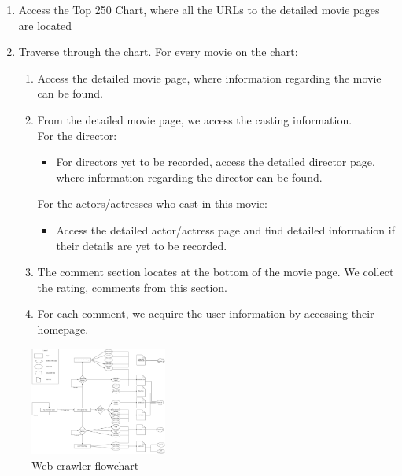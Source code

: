 \begin{CJK*}{UTF8}{gbsn}
\begin{enumerate}
    \item Access the Top 250 Chart, where all the URLs to the detailed movie pages are located
    \item Traverse through the chart. For every movie on the chart:
    \begin{enumerate}
        \item Access the detailed movie page, where information regarding the movie can be found.
        \item From the detailed movie page, we access the casting information.\\ For the director:
        \begin{itemize}
            \item For directors yet to be recorded, access the detailed director page, where information regarding the director can be found.
        \end{itemize}
        For the actors/actresses who cast in this movie:
        \begin{itemize}
            \item Access the detailed actor/actress page and find detailed information if their details are yet to be recorded.
        \end{itemize}
        \item The comment section locates at the bottom of the movie page. We collect the rating, comments from this section.
        \item For each comment, we acquire the user information by accessing their homepage.
    \end{enumerate}
\end{enumerate}

\begin{figure}[h]
    \label{crawler}
    \centering
    \includegraphics[width=0.4\textwidth]{crawler_flowchart.png}
    \caption{Web crawler flowchart}
\end{figure}


\end{CJK*}
